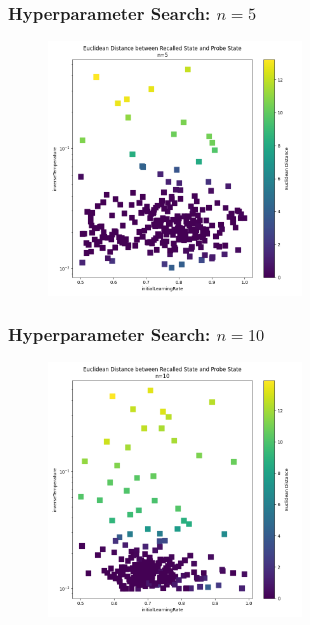 \begin{frame}
    \frametitle{Hyperparameter Search: \(n=5\)}

    \begin{figure}
        \includegraphics[width=0.6\textwidth]{images/hyperparameterSearches/5.png}
    \end{figure}
\end{frame}

\begin{frame}
    \frametitle{Hyperparameter Search: \(n=10\)}

    \begin{figure}
        \includegraphics[width=0.6\textwidth]{images/hyperparameterSearches/10.png}
    \end{figure}
\end{frame}

